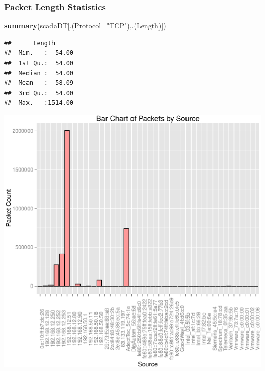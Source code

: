 \documentclass[]{article}
\newenvironment{Shaded}{\begin{snugshade}}{\end{snugshade}}
\newcommand{\KeywordTok}[1]{\textcolor[rgb]{0.13,0.29,0.53}{\textbf{{#1}}}}
\newcommand{\DataTypeTok}[1]{\textcolor[rgb]{0.13,0.29,0.53}{{#1}}}
\newcommand{\StringTok}[1]{\textcolor[rgb]{0.31,0.60,0.02}{{#1}}}
\newcommand{\NormalTok}[1]{{#1}}
\begin{document}
\subsubsection{Packet Length Statistics}\label{packet-length-statistics}

\begin{Shaded}
\begin{Highlighting}[]
\KeywordTok{summary}\NormalTok{(scadaDT[.(}\DataTypeTok{Protocol=}\StringTok{"TCP"}\NormalTok{),.(Length)])}
\end{Highlighting}
\end{Shaded}

\begin{verbatim}
##      Length       
##  Min.   :  54.00  
##  1st Qu.:  54.00  
##  Median :  54.00  
##  Mean   :  58.09  
##  3rd Qu.:  54.00  
##  Max.   :1514.00
\end{verbatim}

\includegraphics{edaReport_files/figure-latex/unnamed-chunk-8-1.pdf}
\end{document}
